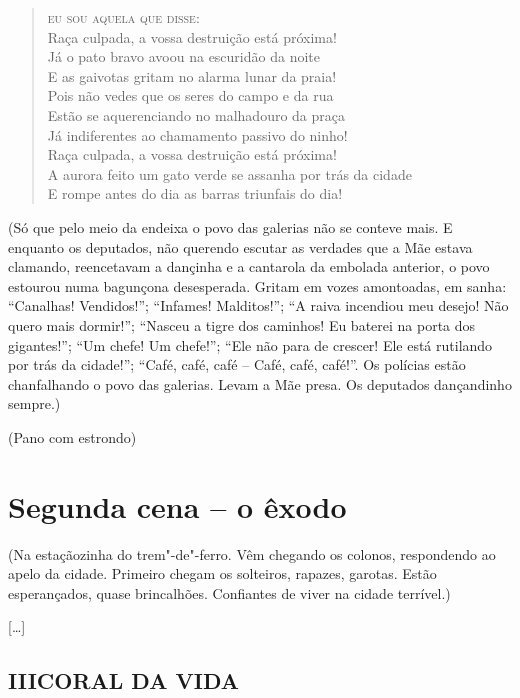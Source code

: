 {\begin{verse}
\textsc{eu sou aquela que disse:}\\
Raça culpada, a vossa destruição está próxima!\\
Já o pato bravo avoou na escuridão da noite\\
E as gaivotas gritam no alarma lunar da praia!\\
Pois não vedes que os seres do campo e da rua\\
Estão se aquerenciando no malhadouro da praça\\
Já indiferentes ao chamamento passivo do ninho!\\
Raça culpada, a vossa destruição está próxima!\\
A aurora feito um gato verde se assanha por trás da cidade\\
E rompe antes do dia as barras triunfais do dia!
\end{verse}

\hfill\parbox{230pt}{
(Só que pelo meio da endeixa o povo das galerias não se conteve mais. E
enquanto os deputados, não querendo escutar as verdades que a Mãe estava
clamando, reencetavam a dançinha e a cantarola da embolada anterior, o
povo estourou numa bagunçona desesperada. Gritam em vozes amontoadas, em
sanha: ``Canalhas! Vendidos!''; ``Infames! Malditos!''; ``A raiva
incendiou meu desejo! Não quero mais dormir!''; ``Nasceu a tigre dos
caminhos! Eu baterei na porta dos gigantes!''; ``Um chefe! Um chefe!'';
``Ele não para de crescer! Ele está rutilando por trás da cidade!'';
``Café, café, café -- Café, café, café!''. Os polícias estão
chanfalhando o povo das galerias. Levam a Mãe presa. Os deputados
dançandinho sempre.)\medskip

\hfill{}(Pano com estrondo)
}


\chapter{Segunda cena -- o êxodo}

\hfill\parbox{150pt}{
(Na estaçãozinha do trem"-de"-ferro. Vêm chegando os colonos, respondendo
ao apelo da cidade. Primeiro chegam os solteiros, rapazes, garotas.
Estão esperançados, quase brincalhões. Confiantes de viver na cidade
terrível.)
}

{[}\ldots{}{]}

\section*{III\break CORAL DA VIDA}\medskip

}
